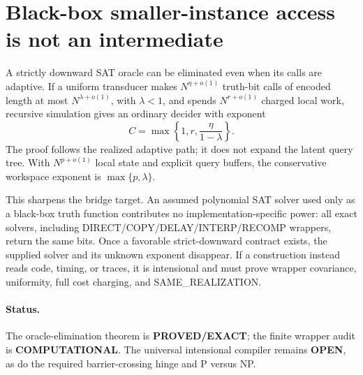 \section{Black-box smaller-instance access is not an intermediate}

A strictly downward SAT oracle can be eliminated even when its calls are
adaptive.  If a uniform transducer makes $N^{\eta+o(1)}$ truth-bit calls of
encoded length at most $N^{\lambda+o(1)}$, with $\lambda<1$, and spends
$N^{r+o(1)}$ charged local work, recursive simulation gives an ordinary
decider with exponent
\[
 C=\max\left\{1,r,\frac{\eta}{1-\lambda}\right\}.
\]
The proof follows the realized adaptive path; it does not expand the latent
query tree.  With $N^{p+o(1)}$ local state and explicit query buffers, the
conservative workspace exponent is $\max\{p,\lambda\}$.

This sharpens the bridge target.  An assumed polynomial SAT solver used only
as a black-box truth function contributes no implementation-specific power:
all exact solvers, including DIRECT/COPY/DELAY/INTERP/RECOMP wrappers, return
the same bits.  Once a favorable strict-downward contract exists, the supplied
solver and its unknown exponent disappear.  If a construction instead reads
code, timing, or traces, it is intensional and must prove wrapper covariance,
uniformity, full cost charging, and SAME\_REALIZATION.

\paragraph{Status.}
The oracle-elimination theorem is \textbf{PROVED/EXACT}; the finite wrapper
audit is \textbf{COMPUTATIONAL}.  The universal intensional compiler remains
\textbf{OPEN}, as do the required barrier-crossing hinge and P versus NP.
